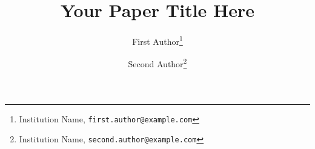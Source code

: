 \documentclass[11pt]{article}
\begin{document}
\title{Your Paper Title Here}

\author{
  First Author\thanks{Institution Name, \texttt{first.author@example.com}} \and
  Second Author\thanks{Institution Name, \texttt{second.author@example.com}}
}

\date{}

\maketitle










\end{document}
